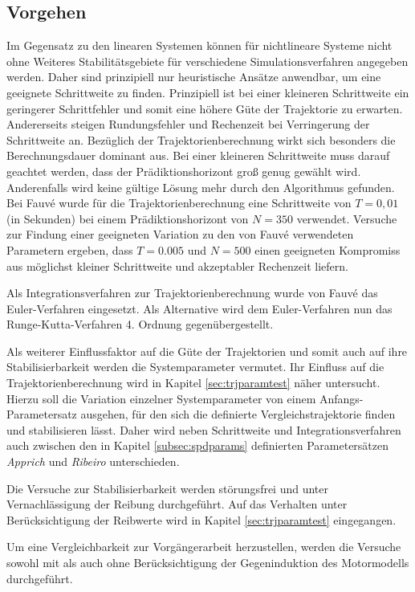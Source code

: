 \subsection{Vorgehen}

Im Gegensatz zu den linearen Systemen können für nichtlineare Systeme nicht ohne Weiteres Stabilitätsgebiete für verschiedene Simulationsverfahren angegeben werden. Daher sind prinzipiell nur heuristische Ansätze anwendbar, um eine geeignete Schrittweite zu finden. Prinzipiell ist bei einer kleineren Schrittweite ein geringerer Schrittfehler und somit eine höhere Güte der Trajektorie zu erwarten. Andererseits steigen Rundungsfehler und Rechenzeit bei Verringerung der Schrittweite an. Bezüglich der Trajektorienberechnung wirkt sich besonders die Berechnungsdauer dominant aus. Bei einer kleineren Schrittweite muss darauf geachtet werden, dass der Prädiktionshorizont groß genug gewählt wird. Anderenfalls wird keine gültige Lösung mehr durch den Algorithmus gefunden. Bei Fauvé \cite{fauve} wurde für die Trajektorienberechnung eine Schrittweite von $T=0,01$ (in Sekunden) bei einem Prädiktionshorizont von $N=350$ verwendet. Versuche zur Findung einer geeigneten Variation zu den von Fauvé \cite{fauve} verwendeten Parametern ergeben, dass $T=0.005$ und $N=500$ einen geeigneten Kompromiss aus möglichst kleiner Schrittweite und akzeptabler Rechenzeit liefern. 

Als Integrationsverfahren zur Trajektorienberechnung wurde von Fauvé \cite{fauve} das Euler-Verfahren eingesetzt. Als Alternative wird dem Euler-Verfahren nun das Runge-Kutta-Verfahren 4. Ordnung gegenübergestellt.

Als weiterer Einflussfaktor auf die Güte der Trajektorien und somit auch auf ihre Stabilisierbarkeit werden die Systemparameter vermutet. Ihr Einfluss auf die Trajektorienberechnung wird in Kapitel \ref{sec:trjparamtest} näher untersucht. Hierzu soll die Variation einzelner Systemparameter von einem Anfangs-Parametersatz ausgehen, für den sich die definierte Vergleichstrajektorie finden und stabilisieren lässt. Daher wird neben Schrittweite und Integrationsverfahren auch zwischen den in Kapitel \ref{subsec:spdparams} definierten Parametersätzen \textit{Apprich} und \textit{Ribeiro} unterschieden.

Die Versuche zur Stabilisierbarkeit werden störungsfrei und unter Vernachlässigung der Reibung durchgeführt. Auf das Verhalten unter Berücksichtigung der Reibwerte wird in Kapitel \ref{sec:trjparamtest} eingegangen. 

Um eine Vergleichbarkeit zur Vorgängerarbeit herzustellen, werden die Versuche sowohl mit als auch ohne Berücksichtigung der Gegeninduktion des Motormodells durchgeführt. 

